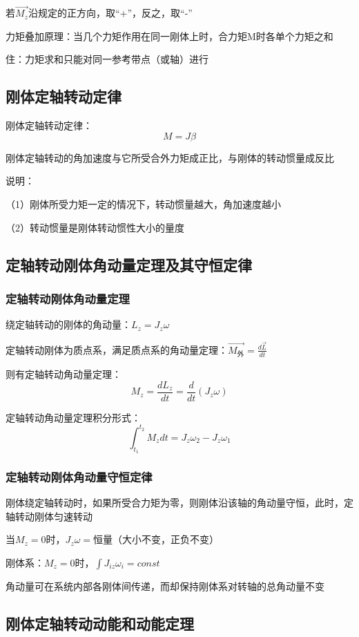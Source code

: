\documentclass[UTF8]{article}
\begin{document}
    若$\vec{M_z}$沿规定的正方向，取“+”，反之，取“-”

    力矩叠加原理：当几个力矩作用在同一刚体上时，合力矩M时各单个力矩之和

    住：力矩求和只能对同一参考带点（或轴）进行

\subsection{刚体定轴转动定律}

    刚体定轴转动定律：\[M = J\beta\]

    刚体定轴转动的角加速度与它所受合外力矩成正比，与刚体的转动惯量成反比

    说明：

    \;\;\;（1）刚体所受力矩一定的情况下，转动惯量越大，角加速度越小

    \;\;（2）转动惯量是刚体转动惯性大小的量度

\subsection{定轴转动刚体角动量定理及其守恒定律}
\subsubsection{定轴转动刚体角动量定理}

    绕定轴转动的刚体的角动量：$L_z = J_z\omega$

    定轴转动刚体为质点系，满足质点系的角动量定理：$\vec{M_{\mbox{外}}} = \frac{d\vec{L}}{dt}$

    则有定轴转动角动量定理：\[M_z = \frac{dL_z}{dt} = \frac{d}{dt}(J_z\omega)\]

    定轴转动角动量定理积分形式：\[\int_{t_1}^{t_2}M_zdt = J_z\omega_2 - J_z\omega_1\]

\subsubsection{定轴转动刚体角动量守恒定律}

    刚体绕定轴转动时，如果所受合力矩为零，则刚体沿该轴的角动量守恒，此时，定轴转动刚体匀速转动

    当$M_z = 0$时，$J_z\omega=$恒量（大小不变，正负不变）

    刚体系：$M_z = 0$时，$\int J_{iz}\omega_i = const$

    角动量可在系统内部各刚体间传递，而却保持刚体系对转轴的总角动量不变

\subsection{刚体定轴转动动能和动能定理}
\end{document}
